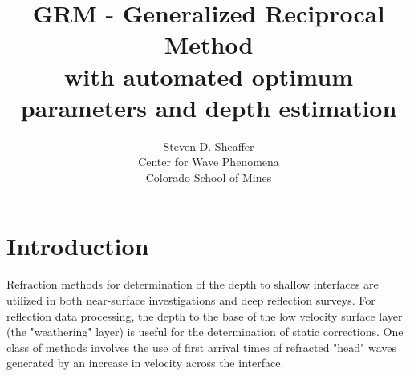 {
\newtheorem{algorithm}{Algorithm}

\title{GRM - Generalized Reciprocal Method \\
 with automated optimum parameters and depth estimation}
\author[Steven D. Sheaffer]{Steven D. Sheaffer\\
Center for Wave Phenomena\\
Colorado School of Mines}


\maketitle

\begin{abstract}

\end{abstract}

\begin{keywords}
\end{keywords}

\section*{Introduction}

Refraction methods for determination of the depth to shallow interfaces
are utilized in both near-surface investigations and deep reflection surveys.
For reflection data processing,
the depth to the base of the low velocity surface layer (the "weathering"
layer) is useful for the determination of static corrections.  
One class of methods involves the use of first arrival times of 
refracted "head" waves generated by an increase in velocity across the
interface.

}
